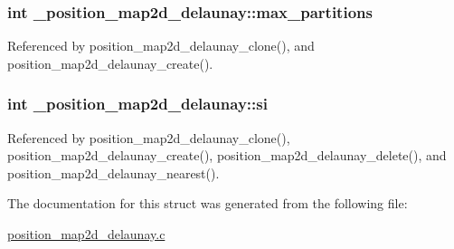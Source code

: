 \subsubsection[{\texorpdfstring{max\+\_\+partitions}{max_partitions}}]{\setlength{\rightskip}{0pt plus 5cm}int \+\_\+position\+\_\+map2d\+\_\+delaunay\+::max\+\_\+partitions}\hypertarget{struct__position__map2d__delaunay_a73d111d78cd506ebc0ff453458249eb0}{}\label{struct__position__map2d__delaunay_a73d111d78cd506ebc0ff453458249eb0}


Referenced by position\+\_\+map2d\+\_\+delaunay\+\_\+clone(), and position\+\_\+map2d\+\_\+delaunay\+\_\+create().

\subsubsection[{\texorpdfstring{si}{si}}]{\setlength{\rightskip}{0pt plus 5cm}int \+\_\+position\+\_\+map2d\+\_\+delaunay\+::si}\hypertarget{struct__position__map2d__delaunay_a34e3a76b0bbc3b0d0fb340a561a58050}{}\label{struct__position__map2d__delaunay_a34e3a76b0bbc3b0d0fb340a561a58050}


Referenced by position\+\_\+map2d\+\_\+delaunay\+\_\+clone(), position\+\_\+map2d\+\_\+delaunay\+\_\+create(), position\+\_\+map2d\+\_\+delaunay\+\_\+delete(), and position\+\_\+map2d\+\_\+delaunay\+\_\+nearest().



The documentation for this struct was generated from the following file\+:\begin{DoxyCompactItemize}
\item 
\hyperlink{position__map2d__delaunay_8c}{position\+\_\+map2d\+\_\+delaunay.\+c}\end{DoxyCompactItemize}
